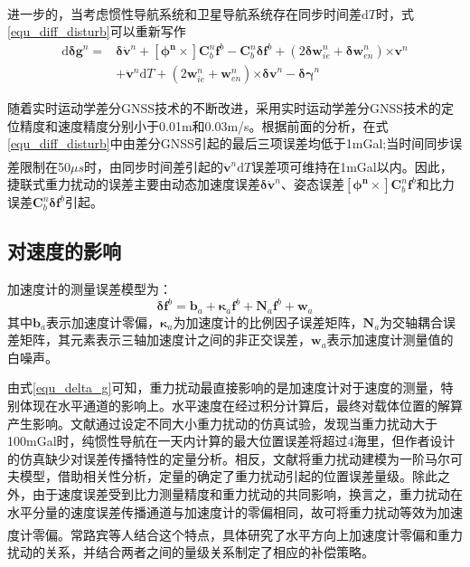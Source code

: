 \documentclass[12pt,a4,utf8]{article}
\newcommand{\upcite}[1]{\textsuperscript{\textsuperscript{\cite{#1}}}} %
\begin{document}
进一步的，当考虑惯性导航系统和卫星导航系统存在同步时间差$\text{d}T$时\upcite{schwarz1995some}，式\ref{equ_diff_disturb}可以重新写作
\begin{equation}
      \begin{aligned}
      \text{d}\bm{\delta g}^n = &\bm{\delta} \dot{\bm{v}}^n + \bm{[\phi^n\times]}\bm{C}^n_b \bm{f}^b - \bm{C}^n_b \bm{\delta f}^b + (2\bm{\delta w}^n_{ie} + \bm{\delta w}^n_{en})\bm{\times v}^n
      \\
      &+\ddot{\bm{v}}^n\text{d}T+(2\bm{w}^n_{ie} + \bm{w}^n_{en})\bm{\times \delta v}^n - \bm{\delta \gamma}^n
      \end{aligned}
      \label{equ_diff_disturb_more}
\end{equation}

随着实时运动学差分GNSS技术的不断改进，采用实时运动学差分GNSS技术的定位精度和速度精度分别小于0.01m和0.03m/s。根据前面的分析，在式\ref{equ_diff_disturb}中由差分GNSS引起的最后三项误差均低于1mGal;当时间同步误差限制在50$\mu s$时，由同步时间差引起的$\ddot{\bm{v}}^n\text{d}T$误差项可维持在1mGal以内\upcite{hao2024methods}。因此，捷联式重力扰动的误差主要由动态加速度误差$\bm{\delta} \dot{\bm{v}}^n$、姿态误差$\bm{[\phi^n\times]}\bm{C}^n_b \bm{f}^b$和比力误差$\bm{C}^n_b \bm{\delta f}^b$引起。

\subsection{对速度的影响}
加速度计的测量误差模型为：
\begin{equation}
      \bm{\delta f}^b = \bm{b}_a + \bm{\kappa}_a \bm{f}^b + \bm{\text{N}}_a \bm{f}^b + \bm{w}_a
      \label{acc_bias}
\end{equation}
其中$\bm{b}_a$表示加速度计零偏，$\bm{\kappa}_a$为加速度计的比例因子误差矩阵，$\bm{\text{N}}_a$为交轴耦合误差矩阵，其元素表示三轴加速度计之间的非正交误差，$\bm{w}_a$表示加速度计测量值的白噪声。

由式\ref{equ_delta_g}可知，重力扰动最直接影响的是加速度计对于速度的测量，特别体现在水平通道的影响上。水平速度在经过积分计算后，最终对载体位置的解算产生影响。文献\cite{gao2021real}通过设定不同大小重力扰动的仿真试验，发现当重力扰动大于100mGal时，纯惯性导航在一天内计算的最大位置误差将超过4海里，但作者设计的仿真缺少对误差传播特性的定量分析。相反，文献\cite{WANGJING2016}将重力扰动建模为一阶马尔可夫模型，借助相关性分析，定量的确定了重力扰动引起的位置误差量级。除此之外，由于速度误差受到比力测量精度和重力扰动的共同影响，换言之，重力扰动在水平分量的速度误差传播通道与加速度计的零偏相同，故可将重力扰动等效为加速度计零偏。常路宾等人结合这个特点\upcite{chang2018gravity}，具体研究了水平方向上加速度计零偏和重力扰动的关系，并结合两者之间的量级关系制定了相应的补偿策略。
\end{document}
